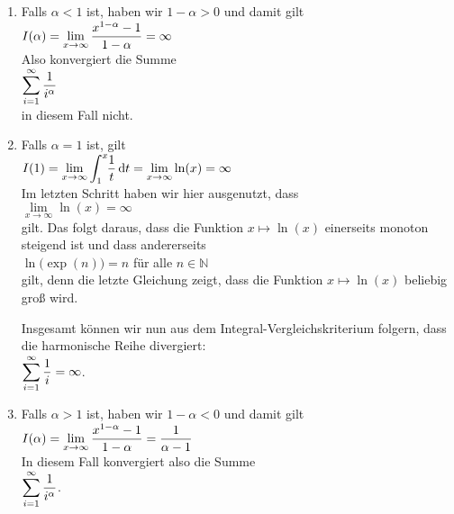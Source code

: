 \begin{enumerate}
\item Falls $\alpha < 1$ ist, haben wir $1-\alpha>0$ und damit gilt
      \\[0.2cm]
      \hspace*{1.3cm}
      $\displaystyle I(\alpha) = \lim\limits_{x \rightarrow \infty} \frac{x^{1-\alpha}-1}{1-\alpha} = \infty$
      \\[0.2cm]
      Also konvergiert die Summe 
      \\[0.2cm]
      \hspace*{1.3cm}
      $\displaystyle \sum\limits_{i=1}^{\infty} \frac{1}{i^\alpha}$
      \\[0.2cm]
      in diesem Fall nicht.
\item Falls $\alpha = 1$ ist, gilt
      \\[0.2cm]
      \hspace*{1.3cm}
      $I(1) = \lim\limits_{x \rightarrow \infty} \dint{1}{x}\; \frac{1}{t}\, \dr t 
            =  \lim\limits_{x \rightarrow \infty} \ln(x)  = \infty
      $
      \\[0.2cm]
      Im letzten Schritt haben wir hier ausgenutzt, dass
      \\[0.2cm]
      \hspace*{1.3cm}
      $\lim\limits_{x \rightarrow \infty} \ln(x) = \infty$
      \\[0.2cm]
      gilt.  Das folgt daraus, dass die Funktion $x \mapsto \ln(x)$ einerseits monoton steigend ist und
      dass andererseits 
      \\[0.2cm]
      \hspace*{1.3cm}
      $\ln\bigl(\exp(n)\bigr) = n$ \quad f\"ur alle $n \in \mathbb{N}$  
      \\[0.2cm]
      gilt, denn die letzte Gleichung zeigt, dass die Funktion $x \mapsto \ln(x)$ beliebig gro{\ss} wird. 

      Insgesamt k\"onnen wir nun aus dem Integral-Vergleichskriterium folgern, dass die
      harmonische Reihe divergiert:
      \\[0.2cm]
      \hspace*{1.3cm}
      $\displaystyle\sum\limits_{i=1}^{\infty} \frac{1}{i} = \infty$.
\item Falls $\alpha > 1$ ist, haben wir $1-\alpha<0$ und damit gilt
      \\[0.2cm]
      \hspace*{1.3cm}
      $\displaystyle I(\alpha) = \lim\limits_{x \rightarrow \infty} \frac{x^{1-\alpha}-1}{1-\alpha} = \frac{1}{\alpha-1}$
      \\[0.2cm]
      In diesem Fall konvergiert also die Summe 
      \\[0.2cm]
      \hspace*{1.3cm}
      $\displaystyle \sum\limits_{i=1}^{\infty} \frac{1}{i^\alpha}$.
\end{enumerate}

